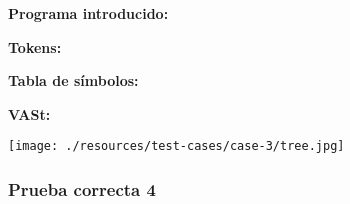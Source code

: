 \documentclass[11pt, , a4paper, titlepage]{article}
\newenvironment{changemargin}[2]{%
\begin{list}{}{%
\setlength{\topsep}{0pt}%
\setlength{\leftmargin}{#1}%
\setlength{\rightmargin}{#2}%
\setlength{\listparindent}{\parindent}%
\setlength{\itemindent}{\parindent}%
\setlength{\parsep}{\parskip}%
}%
\item[]}{\end{list}}
\begin{document}
\begin{changemargin}{+0.5cm}{+0cm}
    \vspace{1mm}                                                                 
    
    \textbf{Programa introducido:}
    \begin{changemargin}{+0.5cm}{+0cm}
        
    \end{changemargin}

    \vspace{2mm}                                                                 

    \textbf{Tokens:}
    \vspace{1mm}                                                                 
    \begin{changemargin}{+0.5cm}{+0cm}
    \end{changemargin}

    \vspace{2mm}                                                                 

    \textbf{Tabla de símbolos:}
    \vspace{1mm}                                                                 
    \begin{changemargin}{+0.5cm}{+0cm}
    \end{changemargin}

    \clearpage                                                             

    \textbf{VASt:}
    \vspace{1mm} 
    \begin{center}
        \texttt{[image: ./resources/test-cases/case-3/tree.jpg]}
    \end{center}             

\end{changemargin}
\clearpage

\subsubsection{Prueba correcta 4}
\end{document}
